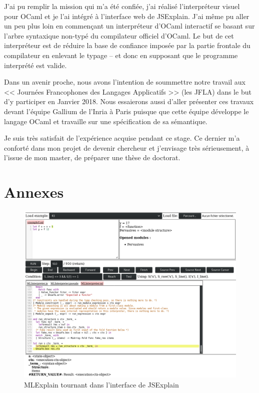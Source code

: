 \documentclass[a4paper,10pt]{article}
\begin{document}
J'ai pu remplir la mission qui m'a été confiée, j'ai réalisé l'interpréteur 
visuel pour OCaml et je l'ai intégré à l'interface web de JSExplain. J'ai même 
pu aller un peu plus loin en commençant un interpréteur d'OCaml interactif se 
basant sur l'arbre syntaxique non-typé du compilateur officiel d'OCaml. Le but 
de cet interpréteur est de réduire la base de confiance imposée par la partie 
frontale du compilateur en enlevant le typage -- et donc en supposant que le 
programme interprété est valide.

Dans un avenir proche, nous avons l'intention de soummettre notre travail aux 
<< Journées Francophones des Langages Applicatifs >> (les JFLA) dans le but d'y 
participer en Janvier 2018. Nous essaierons aussi d'aller présenter ces travaux 
devant l'équipe Gallium de l'Inria à Paris puisque que cette équipe développe 
le langage OCaml et travaille sur une spécification de sa sémantique.

Je suis très satisfait de l'expérience acquise pendant ce stage. Ce dernier m'a 
conforté dans mon projet de devenir chercheur et j'envisage très sérieusement, 
à l'issue de mon master, de préparer une thèse de doctorat.

\newpage
\appendix
\section*{Annexes}
\begin{figure}[hb]
\includegraphics[width=\textwidth]{mlexplain}
\caption{MLExplain tournant dans l'interface de JSExplain}
\label{interface}
\end{figure}
\end{document}
